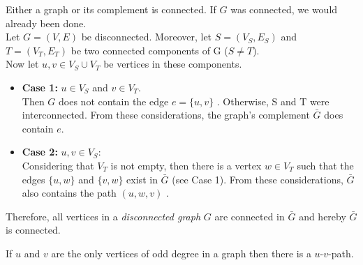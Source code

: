 \documentclass[a4paper]{article}
\begin{document}
	\begin{solution}{3}
		\begin{theorem}{Either a graph or its complement is connected.}
			If $G$ was connected, we would already been done.\\
			Let $G = (V, E)$ be disconnected. Moreover, let $S = (V_S, E_S)$ and $T = (V_T, E_T)$ be two connected components of G ($S \neq T$).\\
			Now let $u, v \in V_S \cup V_T$ be vertices in these components.
			\begin{itemize}
				\item \textbf{Case 1: } $u \in V_S$ and $v \in V_T$.\\
					Then $G$ does not contain the edge $e = \{u, v\}$ . Otherwise, S and T were interconnected. From these considerations, the graph's complement $\bar{G}$ does contain $e$.
				\item  \textbf{Case 2: } $u, v \in V_S$:\\
					Considering that $V_T$ is not empty, then there is a vertex $w \in V_T$ such that the edges $\{u, w\}$ and $\{v, w\}$ exist in $\bar{G}$ (see Case 1). From these considerations, $\bar{G}$ also contains the path $(u, w, v)$ .
			\end{itemize}
			Therefore, all vertices in a \emph{disconnected graph} $G$ are connected in $\bar{G}$ and hereby $\bar{G}$ is connected.\\
		\end{theorem}
	\end{solution} 
	\newpage
	\begin{solution}{4}
		\begin{theorem}{If $u$ and $v$ are the only vertices of odd degree in a graph then there is a $u$-$v$-path.}
			
		\end{theorem}
	\end{solution} 
\end{document}
